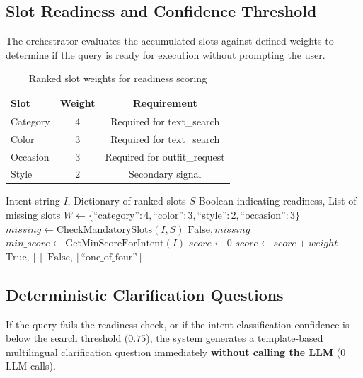 \subsection{Slot Readiness and Confidence Threshold}
The orchestrator evaluates the accumulated slots against defined weights to determine if the query is ready for execution without prompting the user.

\begin{table}[H]
\centering
\begin{tabular}{lcc}
\toprule
\textbf{Slot} & \textbf{Weight} & \textbf{Requirement}\\
\midrule
Category & 4 & Required for text\_search\\
Color & 3 & Required for text\_search\\
Occasion & 3 & Required for outfit\_request\\
Style & 2 & Secondary signal\\
\bottomrule
\end{tabular}
\caption{Ranked slot weights for readiness scoring}
\end{table}

\begin{algorithm}[H]
\caption{Slot Readiness Evaluation}\label{alg:slot_readiness}
\begin{algorithmic}[1]
\Require Intent string $I$, Dictionary of ranked slots $S$
\Ensure Boolean indicating readiness, List of missing slots
\State $W \gets \{ \text{``category''}: 4, \text{``color''}: 3, \text{``style''}: 2, \text{``occasion''}: 3 \}$
    \State $missing \gets \text{CheckMandatorySlots}(I, S)$
        \State \Return $\text{False}, missing$
    \EndIf
    \State $min\_score \gets \text{GetMinScoreForIntent}(I)$ 
    \State $score \gets 0$
            \State $score \gets score + weight$
        \EndIf
    \EndFor
        \State \Return $\text{True}, []$
    \Else
        \State \Return $\text{False}, [\text{``one\_of\_four''}]$
    \EndIf
\EndFunction
\end{algorithmic}
\end{algorithm}

\subsection{Deterministic Clarification Questions}
If the query fails the readiness check, or if the intent classification confidence is below the search threshold ($0.75$), the system generates a template-based multilingual clarification question immediately \textbf{without calling the LLM} (0 LLM calls).

